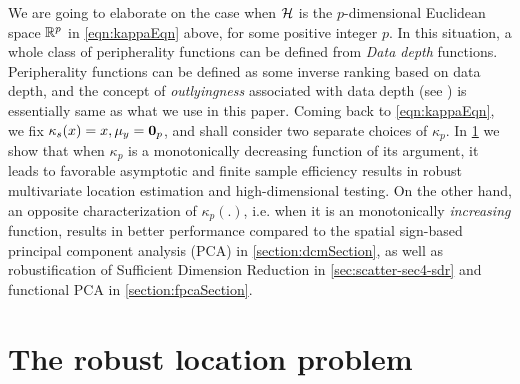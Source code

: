 We are going to elaborate on the case when ${\cal{H}}$ is the $p$-dimensional Euclidean space ${\mathbb{R}}^p$ in \ref{eqn:kappaEqn} above, for some positive integer $p$. In this situation, a whole class of peripherality functions can be defined from {\it Data depth} functions.
Peripherality functions can be defined as some inverse ranking based on data depth, and the concept of {\it outlyingness} associated with data depth (see \cite{zuo00}) is essentially same as what we use in this paper.  Coming back to \ref{eqn:kappaEqn}, we fix $\kappa_s(x)=x, \mu_y = {\bf 0}_p$, and shall consider two separate choices of $\kappa_p$. In \ref{sec:scatter-sec2-location} we show that when $\kappa_{p}$ is a monotonically decreasing function of its argument, it leads to favorable asymptotic and finite sample efficiency results in robust multivariate location estimation and high-dimensional testing. On the other hand, an opposite characterization of $\kappa_p(.)$, i.e. when it is an monotonically \textit{increasing} function, results in better performance compared to the spatial sign-based principal component analysis (PCA) in \ref{section:dcmSection}, as well as robustification of Sufficient Dimension Reduction \citep{AdragniCook09} in \ref{sec:scatter-sec4-sdr} and functional PCA in \ref{section:fpcaSection}.


\section{The robust location problem}\label{sec:scatter-sec2-location}

